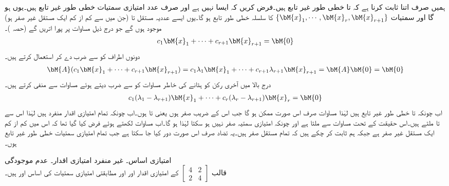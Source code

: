ہمیں صرف اتنا ثابت کرنا ہے کہ  تا  خطی طور غیر تابع ہیں۔فرض کریں کہ ایسا نہیں ہے اور صرف  عدد امتیازی سمتیات خطی طور غیر تابع ہیں۔یوں  ہو گا اور  سمتیات
$\{\bM{x}_1, \cdots , \bM{x}_r,\bM{x}_{r+1}  \}$
کا سلسلہ خطی طور تابع ہو گا۔یوں ایسے عددیہ مستقل  تا  (جن میں سے کم از کم ایک مستقل غیر صفر ہو) موجود ہوں گے جو درج ذیل مساوات پر پورا اتریں گے (حصہ )۔
\begin{align}\label{مساوات_امتیازی_اساس_ثبوت_الف}
c_1\bM{x}_1+\cdots+c_{r+1}\bM{x}_{r+1}=\bM{0}
\end{align}  
دونوں اطراف کو  سے ضرب دے کر  استعمال کرتے ہیں۔
\begin{align}\label{مساوات_امتیازی_اساس_ثبوت_ب}
\bM{A}(c_1\bM{x}_1+\cdots+c_{r+1}\bM{x}_{r+1})=c_1\lambda_1\bM{x}_1+\cdots+c_{r+1}\lambda_{r+1}\bM{x}_{r+1}=\bM{A}\bM{0}=\bM{0}
\end{align}  
درج بالا میں آخری رکن کو ہٹانے کی خاطر مساوات  کو  سے ضرب دیتے ہوئے مساوات  سے منفی کرتے ہیں۔
\begin{align}\label{مساوات_امتیازی_اساس_ثبوت_پ}
c_1(\lambda_1-\lambda_{r+1})\bM{x}_1+\cdots+c_r(\lambda_r-\lambda_{r+1})\bM{x}_r=\bM{0}
\end{align}
اب چونکہ  تا  خطی طور غیر تابع ہیں لہٰذا مساوات  صرف اس صورت ممکن ہو گا جب اس کے  ضریب  صفر ہوں یعنی  تا     ہوں۔اب چونکہ تمام امتیازی اقدار منفرد ہیں لہٰذا اس سے  تا  ملتے ہیں۔اس حقیقت کے تحت مساوات  سے  ملتا ہے اور چونکہ امتیازی سمتیہ صفر نہیں ہو سکتا لہٰذا  ہو گا۔اب  مساوات  لکھتے ہوئے فرض کیا گیا تھا کہ اس میں کم از کم ایک مستقل غیر صفر ہے جبکہ ہم ثابت کر چکے ہیں کہ تمام مستقل صفر ہیں۔یہ تضاد صرف اس صورت دور کیا جا سکتا ہے جب تمام امتیازی سمتیات خطی طور غیر تابع ہوں۔ 

\quad امتیازی اساس۔ غیر منفرد امتیازی اقدار۔ عدم موجودگی\\
قالب 
$ [\begin{smallmatrix}4&2\\2&4 \end{smallmatrix}]  $
کے امتیازی اقدار  اور  اور  مطابقتی امتیازی سمتیات کی اساس  اور  ہیں۔

